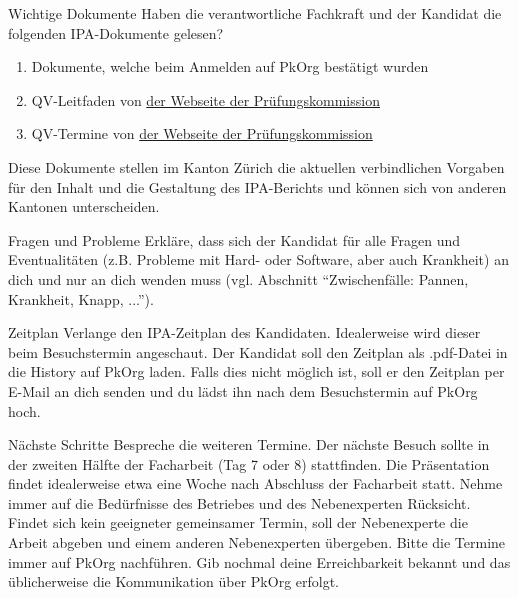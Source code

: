 \begin{taskitem}{Wichtige Dokumente}
  Haben die verantwortliche Fachkraft und der Kandidat die folgenden IPA-Dokumente gelesen?
  \begin{enumerate}
    \item Dokumente, welche beim Anmelden auf PkOrg bestätigt wurden
    \item QV-Leitfaden von \href{https://pk19.ch}{der Webseite der Prüfungskommission}
    \item QV-Termine von \href{https://pk19.ch}{der Webseite der Prüfungskommission}
  \end{enumerate}
  Diese Dokumente stellen im Kanton Zürich die aktuellen verbindlichen Vorgaben für den Inhalt und die Gestaltung des IPA-Berichts und können sich von anderen Kantonen unterscheiden.
\end{taskitem}
\begin{taskitem}{Fragen und Probleme}
  Erkläre, dass sich der Kandidat für alle Fragen und Eventualitäten (z.B. Probleme mit Hard- oder Software, aber auch Krankheit) an dich und nur an dich wenden muss (vgl. Abschnitt \enquote{Zwischenfälle: Pannen, Krankheit, Knapp, ...}).
\end{taskitem}
\begin{taskitem}{Zeitplan}
  Verlange den IPA-Zeitplan des Kandidaten. Idealerweise wird dieser beim Besuchstermin angeschaut. Der Kandidat soll den Zeitplan als .pdf-Datei in die History auf PkOrg laden. Falls dies nicht möglich ist, soll er den Zeitplan per E-Mail an dich senden und du lädst ihn nach dem Besuchstermin auf PkOrg hoch.
\end{taskitem}
\begin{taskitem}{Nächste Schritte}
  Bespreche die weiteren Termine. Der nächste Besuch sollte in der zweiten Hälfte der Facharbeit (Tag 7 oder 8) stattfinden. Die Präsentation findet idealerweise etwa eine Woche nach Abschluss der Facharbeit statt. Nehme immer auf die Bedürfnisse des Betriebes und des Nebenexperten Rücksicht. Findet sich kein geeigneter gemeinsamer Termin, soll der Nebenexperte die Arbeit abgeben und einem anderen Nebenexperten übergeben. Bitte die Termine immer auf PkOrg nachführen.
  Gib nochmal deine Erreichbarkeit bekannt und das üblicherweise die Kommunikation über PkOrg erfolgt.
\end{taskitem}
